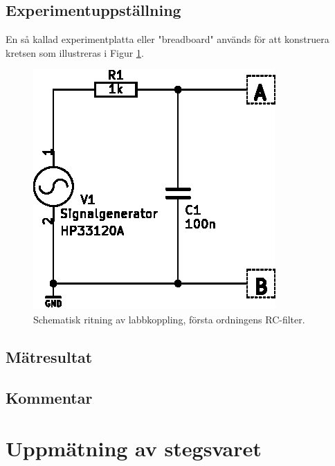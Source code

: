 \documentclass[11pt,a4paper]{article}
\begin{document}
\subsection{Experimentuppställning}\label{}
En så kallad experimentplatta eller "breadboard"
används för att konstruera kretsen som illustreras i Figur \ref{fig:1-freqdom_schem}.


\begin{figure}
    \centering
    \includegraphics[width=0.6\linewidth]{img/1-freqdom_schem}
    \caption[Schematisk ritning av labbkoppling, första ordningens RC-filter.]
    {Schematisk ritning av labbkoppling, första ordningens RC-filter.}
    \label{fig:1-freqdom_schem}
\end{figure}


\subsection{Mätresultat}\label{}

\subsection{Kommentar}\label{}


\section{Uppmätning av stegsvaret}\label{}
\end{document}
